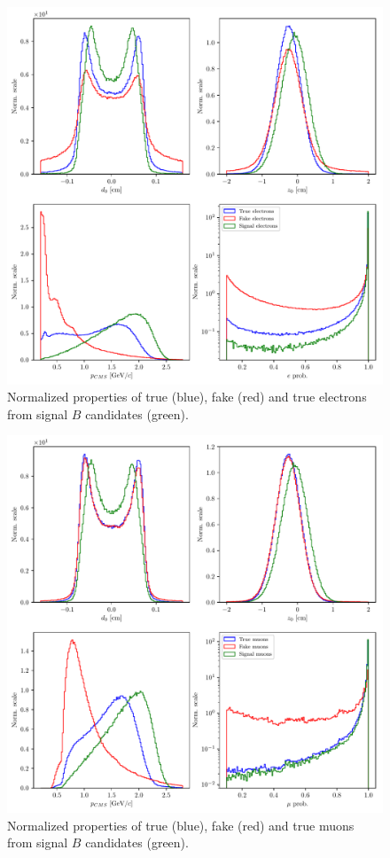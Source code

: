 \begin{figure}[H]
	\centering
	\includegraphics[width=\linewidth]{fig/FSP_e_vars}
	\captionsetup{width=.8\linewidth}
	\caption{Normalized properties of true (blue), fake (red) and true electrons from signal $B$ candidates (green).}
	\label{fig:evars}
\end{figure}

\begin{figure}[H]
	\centering
	\includegraphics[width=\linewidth]{fig/FSP_mu_vars}
	\captionsetup{width=.8\linewidth}
	\caption{Normalized properties of true (blue), fake (red) and true muons from signal $B$ candidates (green).}
	\label{fig:muvars}
\end{figure}

